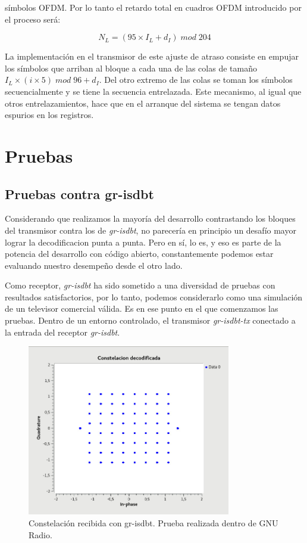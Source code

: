 \documentclass[journal,comsoc]{IEEEtran}
\begin{document}
\noindent símbolos OFDM. Por lo tanto el retardo total en cuadros OFDM introducido por el proceso será:

\begin{equation}
N_L = (95 \times I_L + d_I) \; mod \; 204
\end{equation}

La implementación en el transmisor de este ajuste de atraso consiste en empujar los símbolos que arriban al bloque a cada una de las colas de tamaño $I_L \times (i \times 5) \; mod \; 96 + d_I$. Del otro extremo de las colas se toman los símbolos secuencialmente y se tiene la secuencia entrelazada. Este mecanismo, al igual que otros entrelazamientos, hace que en el arranque del sistema se tengan datos espurios en los registros.



\section{Pruebas}
\subsection{Pruebas contra gr-isdbt}

Considerando que realizamos la mayoría del desarrollo contrastando los bloques del transmisor contra los de \textit{gr-isdbt}, no parecería en principio un desafío mayor lograr la decodificacion punta a punta. Pero en sí, lo es, y eso es parte de la potencia del desarrollo con código abierto, constantemente podemos estar evaluando nuestro desempeño desde el otro lado. 

Como receptor, \textit{gr-isdbt} ha sido sometido a una diversidad de pruebas con resultados satisfactorios, por lo tanto, podemos considerarlo como una simulación de un televisor comercial válida. Es en ese punto en el que comenzamos las pruebas. Dentro de un entorno controlado, el transmisor \textit{gr-isdbt-tx} conectado a la entrada del receptor \textit{gr-isdbt}.

\begin{figure}[!h]
\centering
\includegraphics[width=3.5in]{figuras/const_rec}
\caption{Constelación recibida con gr-isdbt. Prueba realizada dentro de GNU Radio.}
\label{const_rec}
\end{figure}
\end{document}

